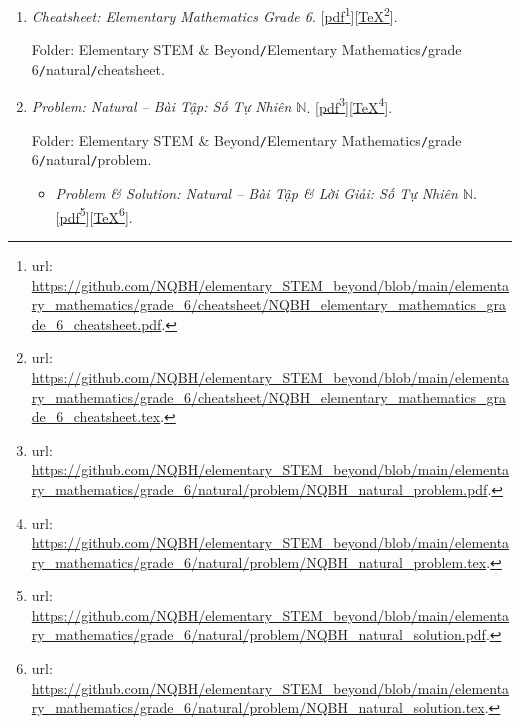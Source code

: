 \documentclass[12pt,twoside]{book}
\begin{document}
\begin{enumerate}
	\item {\it Cheatsheet: Elementary Mathematics Grade 6}. [\href{https://github.com/NQBH/elementary_STEM_beyond/blob/main/elementary_mathematics/grade_6/cheatsheet/NQBH_elementary_mathematics_grade_6_cheatsheet.pdf}{pdf}\footnote{{\sc url}: \url{https://github.com/NQBH/elementary_STEM_beyond/blob/main/elementary_mathematics/grade_6/cheatsheet/NQBH_elementary_mathematics_grade_6_cheatsheet.pdf}.}][\href{https://github.com/NQBH/elementary_STEM_beyond/blob/main/elementary_mathematics/grade_6/cheatsheet/NQBH_elementary_mathematics_grade_6_cheatsheet.tex}{\TeX}\footnote{{\sc url}: \url{https://github.com/NQBH/elementary_STEM_beyond/blob/main/elementary_mathematics/grade_6/cheatsheet/NQBH_elementary_mathematics_grade_6_cheatsheet.tex}.}].
	
	Folder: {\sf Elementary STEM \& Beyond{\tt/}Elementary Mathematics{\tt/}grade 6{\tt/}natural{\tt/}cheatsheet}.
	\item {\it Problem: Natural -- Bài Tập: Số Tự Nhiên $\mathbb{N}$}. [\href{https://github.com/NQBH/elementary_STEM_beyond/blob/main/elementary_mathematics/grade_6/natural/problem/NQBH_natural_problem.pdf}{pdf}\footnote{{\sc url}: \url{https://github.com/NQBH/elementary_STEM_beyond/blob/main/elementary_mathematics/grade_6/natural/problem/NQBH_natural_problem.pdf}.}][\href{https://github.com/NQBH/elementary_STEM_beyond/blob/main/elementary_mathematics/grade_6/natural/problem/NQBH_natural_problem.tex}{\TeX}\footnote{{\sc url}: \url{https://github.com/NQBH/elementary_STEM_beyond/blob/main/elementary_mathematics/grade_6/natural/problem/NQBH_natural_problem.tex}.}].
	
	Folder: {\sf Elementary STEM \& Beyond{\tt/}Elementary Mathematics{\tt/}grade 6{\tt/}natural{\tt/}problem}.
	\begin{itemize}
		\item {\it Problem \& Solution: Natural -- Bài Tập \& Lời Giải: Số Tự Nhiên $\mathbb{N}$}. [\href{https://github.com/NQBH/elementary_STEM_beyond/blob/main/elementary_mathematics/grade_6/natural/problem/NQBH_natural_solution}{pdf}\footnote{{\sc url}: \url{https://github.com/NQBH/elementary_STEM_beyond/blob/main/elementary_mathematics/grade_6/natural/problem/NQBH_natural_solution.pdf}.}][\href{https://github.com/NQBH/elementary_STEM_beyond/blob/main/elementary_mathematics/grade_6/natural/problem/NQBH_natural_solution.tex}{\TeX}\footnote{{\sc url}: \url{https://github.com/NQBH/elementary_STEM_beyond/blob/main/elementary_mathematics/grade_6/natural/problem/NQBH_natural_solution.tex}.}].
		

\end{itemize}
\end{enumerate}
\end{document}
